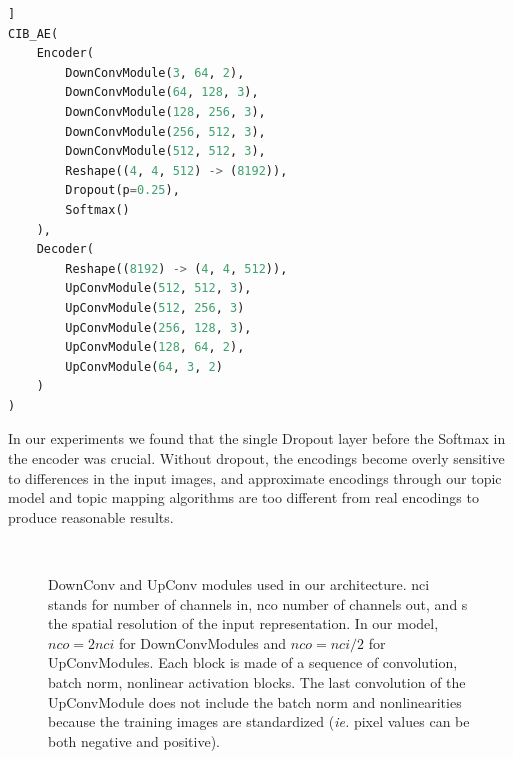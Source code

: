 \begin{appendices}
\begin{lstlisting}[language=Python, caption=CIB-AE Architecture Detail, label=cibae_arch]]
CIB_AE(
    Encoder(
        DownConvModule(3, 64, 2),
        DownConvModule(64, 128, 3),
        DownConvModule(128, 256, 3),
        DownConvModule(256, 512, 3),
        DownConvModule(512, 512, 3),
        Reshape((4, 4, 512) -> (8192)),
        Dropout(p=0.25),
        Softmax()
    ), 
    Decoder(
        Reshape((8192) -> (4, 4, 512)),
        UpConvModule(512, 512, 3),
        UpConvModule(512, 256, 3)
        UpConvModule(256, 128, 3),
        UpConvModule(128, 64, 2),
        UpConvModule(64, 3, 2)
    )
)
\end{lstlisting}

In our experiments we found that the single Dropout layer before the Softmax in the encoder was crucial. Without dropout, the encodings become overly sensitive to differences in the input images, and approximate encodings through our topic model and topic mapping algorithms are too different from real encodings to produce reasonable results.

\begin{figure}
    \begin{center}
    \\
    \end{center}
    \caption{
    \protect{} DownConv and \protect{} UpConv modules used in our architecture. nci stands for number of channels in, nco number of channels out, and s the spatial resolution of the input representation. In our model, $nco = 2 nci$ for DownConvModules and $nco = nci/2$ for UpConvModules. Each block is made of a sequence of convolution, batch norm, nonlinear activation blocks. The last convolution of the UpConvModule does not include the batch norm and nonlinearities because the training images are standardized (\emph{ie.} pixel values can be both negative and positive).
    }
    \label{fig:cib-ae_modules}
\end{figure}


\end{appendices}
